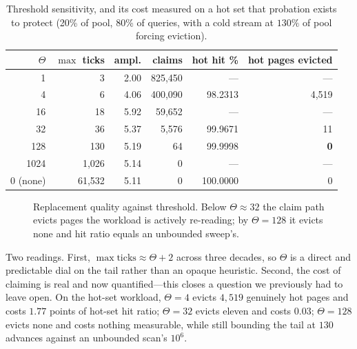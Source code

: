 \documentclass[sigconf,nonacm]{acmart}
\begin{document}
\begin{table}[t]
\centering
\caption{Threshold sensitivity, and its cost measured on a hot set that
probation exists to protect (20\% of pool, 80\% of queries, with a cold stream
at $130\%$ of pool forcing eviction).}
\label{tab:theta}
\small
\begin{tabular}{rrrrrr}
\toprule
$\Theta$ & $\max$ ticks & ampl. & claims & hot hit \% & hot pages evicted \\
\midrule
1        & 3      & 2.00 & 825{,}450 & --- & --- \\
4        & 6      & 4.06 & 400{,}090 & 98.2313 & 4{,}519 \\
16       & 18     & 5.92 & 59{,}652  & --- & --- \\
32       & 36     & 5.37 & 5{,}576   & 99.9671 & 11 \\
128      & 130    & 5.19 & 64        & 99.9998 & \textbf{0} \\
1024     & 1{,}026& 5.14 & 0         & --- & --- \\
0 (none) & 61{,}532 & 5.11 & 0       & 100.0000 & 0 \\
\bottomrule
\end{tabular}
\end{table}

\begin{figure}[t]
\centering
{}
\caption{Replacement quality against threshold. Below $\Theta\approx32$ the
claim path evicts pages the workload is actively re-reading; by $\Theta=128$ it
evicts none and hit ratio equals an unbounded sweep's.}
\label{fig:harm}
\end{figure}

Two readings. First, $\max \text{ticks} \approx \Theta + 2$ across three
decades, so $\Theta$ is a direct and predictable dial on the tail rather than
an opaque heuristic. Second, the cost of claiming is real and now
quantified---this closes a question we previously had to leave open. On the
hot-set workload, $\Theta=4$ evicts $4{,}519$ genuinely hot pages and costs
$1.77$ points of hot-set hit ratio; $\Theta=32$ evicts eleven and costs
$0.03$; $\Theta=128$ evicts none and costs nothing measurable, while still
bounding the tail at $130$ advances against an unbounded scan's $10^6$.
\end{document}
